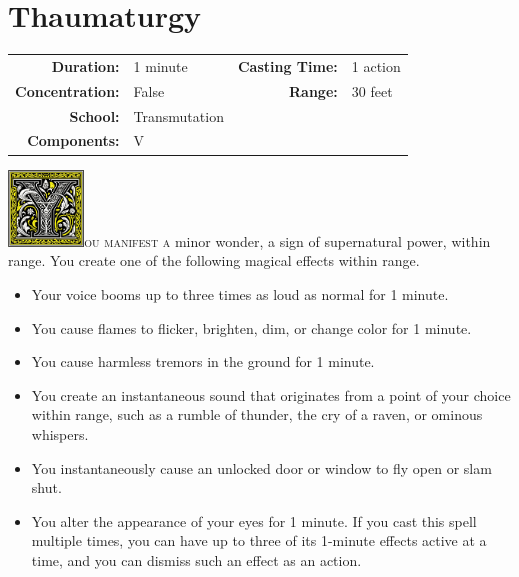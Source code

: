 \documentclass[12pt,showtrims]{memoir}
\begin{document}
\newpage
\section*{Thaumaturgy}

{
\small\centering\vspace{-6pt}
\begin{tabular}{rlrl}
\toprule

\textbf{Duration:} & 1 minute &
\textbf{Casting Time:} & 1 action \\
\textbf{Concentration:} & False &
\textbf{Range:} & 30 feet \\
\textbf{School:} & Transmutation \\
\textbf{Components:} & \multicolumn{3}{p{0.7\textwidth}}{V}\\

\bottomrule
\end{tabular}
}

\vspace{1\baselineskip}\noindent
\lettrine[lines=4]{\includegraphics[height=58pt]{initials/Y.png}}{ou manifest a} minor wonder, a sign of supernatural power, within range. You create one of the following magical effects within range.
\vspace{6pt}
\begin{itemize}
    \item Your voice booms up to three times as loud as normal for 1 minute.
    \item You cause flames to flicker, brighten, dim, or change color for 1 minute.
    \item You cause harmless tremors in the ground for 1 minute.
    \item You create an instantaneous sound that originates from a point of your choice within range, such as a rumble of thunder, the cry of a raven, or ominous whispers.
    \item You instantaneously cause an unlocked door or window to fly open or slam shut.
    \item You alter the appearance of your eyes for 1 minute. If you cast this spell multiple times, you can have up to three of its 1-minute effects active at a time, and you can dismiss such an effect as an action.
\end{itemize}
\end{document}
